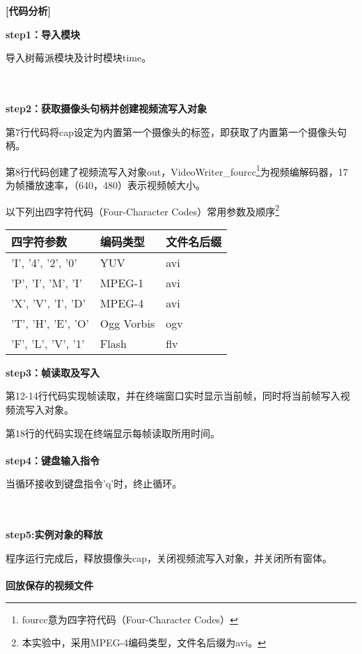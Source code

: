 \documentclass{article}
\begin{document}
\textbf{[代码分析]}

\textbf{step1：导入模块}

导入树莓派模块及计时模块time。



\\ \hspace*{\fill} \\
\indent\textbf{step2：获取摄像头句柄并创建视频流写入对象}

第7行代码将cap设定为内置第一个摄像头的标签，即获取了内置第一个摄像头句柄。

第8行代码创建了视频流写入对象out，VideoWriter\_fourcc\footnote{fourcc意为四字符代码（Four-Character Codes）}为视频编解码器，17为帧播放速率，（640，480）表示视频帧大小。


以下列出四字符代码（Four-Character Codes）常用参数及顺序\footnote{本实验中，采用MPEG-4编码类型，文件名后缀为avi。}

\begin{center}
    \begin{tabular}{|p{2.4cm}|p{2cm}|p{1.8cm}|}
    \hline
     四字符参数 &编码类型 &文件名后缀  \\\hline
        'I', '4', '2', '0'  & YUV& avi \\\hline
         'P', 'I', 'M', 'I'  & MPEG-1& avi \\\hline
         'X', 'V', 'I', 'D'   & MPEG-4& avi \\\hline
          'T', 'H', 'E', 'O'   &Ogg Vorbis &ogv  \\\hline
           'F', 'L', 'V', '1'  & Flash& flv \\\hline
    \end{tabular}
\end{center}
 

\textbf{step3：帧读取及写入}

第12-14行代码实现帧读取，并在终端窗口实时显示当前帧，同时将当前帧写入视频流写入对象。

第18行的代码实现在终端显示每帧读取所用时间。
\\ \hspace*{\fill} \\
\indent\textbf{step4：键盘输入指令}

当循环接收到键盘指令'q'时，终止循环。

\\\hspace*{\fill}\\
\indent\textbf{step5:实例对象的释放}

程序运行完成后，释放摄像头cap，关闭视频流写入对象，并关闭所有窗体。
\\\hspace*{\fill}\\
\indent\textbf{回放保存的视频文件}
\end{document}
